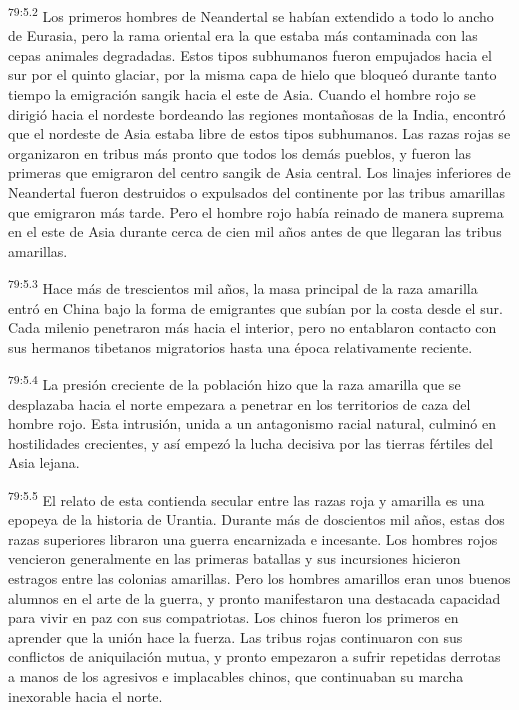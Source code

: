 \par
\textsuperscript{79:5.2} Los primeros hombres de Neandertal se habían extendido a todo lo ancho de Eurasia, pero la rama oriental era la que estaba más contaminada con las cepas animales degradadas. Estos tipos subhumanos fueron empujados hacia el sur por el quinto glaciar, por la misma capa de hielo que bloqueó durante tanto tiempo la emigración sangik hacia el este de Asia. Cuando el hombre rojo se dirigió hacia el nordeste bordeando las regiones montañosas de la India, encontró que el nordeste de Asia estaba libre de estos tipos subhumanos. Las razas rojas se organizaron en tribus más pronto que todos los demás pueblos, y fueron las primeras que emigraron del centro sangik de Asia central. Los linajes inferiores de Neandertal fueron destruidos o expulsados del continente por las tribus amarillas que emigraron más tarde. Pero el hombre rojo había reinado de manera suprema en el este de Asia durante cerca de cien mil años antes de que llegaran las tribus amarillas.

\par
\textsuperscript{79:5.3} Hace más de trescientos mil años, la masa principal de la raza amarilla entró en China bajo la forma de emigrantes que subían por la costa desde el sur. Cada milenio penetraron más hacia el interior, pero no entablaron contacto con sus hermanos tibetanos migratorios hasta una época relativamente reciente.

\par
\textsuperscript{79:5.4} La presión creciente de la población hizo que la raza amarilla que se desplazaba hacia el norte empezara a penetrar en los territorios de caza del hombre rojo. Esta intrusión, unida a un antagonismo racial natural, culminó en hostilidades crecientes, y así empezó la lucha decisiva por las tierras fértiles del Asia lejana.

\par
\textsuperscript{79:5.5} El relato de esta contienda secular entre las razas roja y amarilla es una epopeya de la historia de Urantia. Durante más de doscientos mil años, estas dos razas superiores libraron una guerra encarnizada e incesante. Los hombres rojos vencieron generalmente en las primeras batallas y sus incursiones hicieron estragos entre las colonias amarillas. Pero los hombres amarillos eran unos buenos alumnos en el arte de la guerra, y pronto manifestaron una destacada capacidad para vivir en paz con sus compatriotas. Los chinos fueron los primeros en aprender que la unión hace la fuerza. Las tribus rojas continuaron con sus conflictos de aniquilación mutua, y pronto empezaron a sufrir repetidas derrotas a manos de los agresivos e implacables chinos, que continuaban su marcha inexorable hacia el norte.

